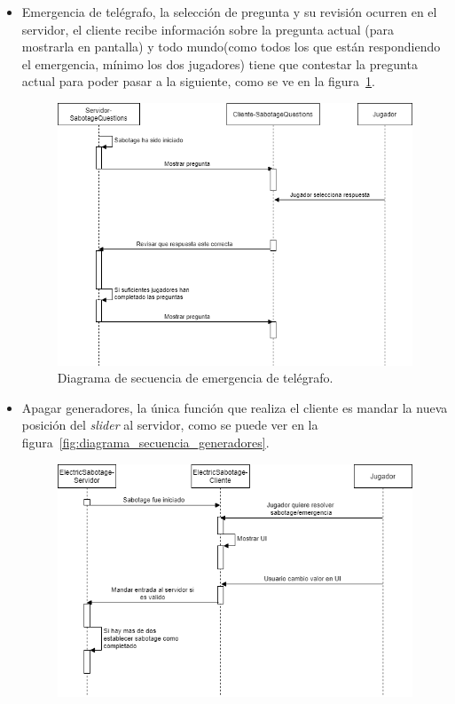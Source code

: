 \begin{itemize}
    \item Emergencia de telégrafo, la selección de pregunta y su revisión ocurren en el servidor, el cliente recibe información sobre la pregunta actual (para mostrarla en pantalla) y todo mundo(como todos los que están respondiendo el emergencia, mínimo los dos jugadores) tiene que contestar la pregunta actual para poder pasar a la siguiente, como se ve en la figura~\ref{fig:diagrama_secuencia_emergencia_pregunta}.
    \begin{figure}[H]
            \centering
            \includegraphics[width=1\linewidth]{images/diagrama_secuencia_sabotage_preguntas.png}
            \caption{Diagrama de secuencia de emergencia de telégrafo.}
            \label{fig:diagrama_secuencia_emergencia_pregunta}
    \end{figure}
    \item Apagar generadores, la única función que realiza el cliente es mandar la nueva posición del \textit{slider} al servidor, como se puede ver en la figura~\ref{fig:diagrama_secuencia_generadores}.
        \begin{figure}[H]
            \centering
            \includegraphics[width=1\linewidth]{images/DiagramaSecuenciaSabotageGeneradores.png}

\end{figure}
\end{itemize}
